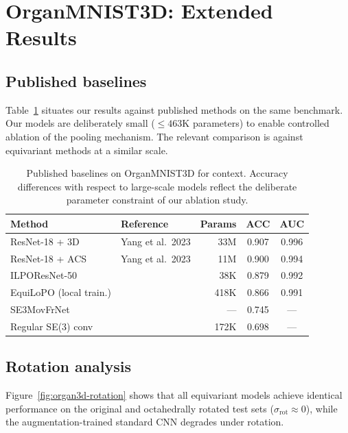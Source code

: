 \documentclass{article}
\theoremstyle{definition}
\theoremstyle{remark}
\theoremstyle{definition}
\begin{document}
\section{OrganMNIST3D: Extended Results}
\label{app:organ3d-details}

\subsection{Published baselines}

Table~\ref{tab:organ3d-context} situates our results against published
methods on the same benchmark. Our models are deliberately small
(${\leq}463$K parameters) to enable controlled ablation of the pooling
mechanism. The relevant comparison is against equivariant methods at a
similar scale.

\begin{table}[h]
  \caption{Published baselines on OrganMNIST3D for context.
    Accuracy differences with respect to large-scale models reflect the
    deliberate parameter constraint of our ablation study.}
  \label{tab:organ3d-context}
  \centering
  \small
  \begin{tabular}{llrcc}
    \toprule
    Method & Reference & Params & ACC & AUC \\
    \midrule
    ResNet-18 + 3D           & Yang et al.\ 2023         & 33M  & 0.907 & 0.996 \\
    ResNet-18 + ACS          & Yang et al.\ 2023         & 11M  & 0.900 & 0.994 \\
    ILPOResNet-50            & \citet{zhemchuzhnikov2024ilponet}       & 38K  & 0.879 & 0.992 \\
    EquiLoPO (local train.)  & \citet{zhemchuzhnikov2025equilopo}      & 418K & 0.866 & 0.991 \\
    SE3MovFrNet              & \citet{sangalli2023movfrnet}     & ---  & 0.745 & ---   \\
    Regular SE(3) conv       & \citet{kuipers2023regular}   & 172K & 0.698 & ---   \\
    \bottomrule
  \end{tabular}
\end{table}

\subsection{Rotation analysis}

Figure~\ref{fig:organ3d-rotation} shows that all equivariant models
achieve identical performance on the original and octahedrally rotated
test sets ($\sigma_{\mathrm{rot}} \approx 0$), while the
augmentation-trained standard CNN degrades under rotation.
\end{document}
